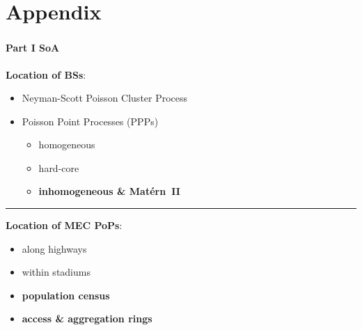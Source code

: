 \documentclass[aspectratio=169]{beamer}
\begin{document}
\section*{Appendix}
\begin{frame}
    \frametitle{\secname}
    \framesubtitle{Part I SoA}
    \textbf{Location of BSs}:
    \begin{itemize}
        \item Neyman-Scott Poisson Cluster Process~\cite{vinay-moller-interference}
        \item Poisson Point Processes (PPPs)~\cite{stochastic-martina}
            \begin{itemize}
                \item homogeneous~\cite{cran-vinay-moller,hetnets-cor}
                \item hard-core~\cite{hard-core-cover} \pause
                \item {\color{red}\textbf{inhomogeneous \& Matérn~II}}
            \end{itemize}
    \end{itemize}
    \pause
    \vfill
    \hrule
    \vfill
    \textbf{Location of MEC PoPs}:
    \begin{itemize}
        \item along highways~\cite{usa-mec}
        \item within stadiums~\cite{tokio-olympics} \pause
        \item {\color{red}\textbf{population census}}
        \item {\color{red}\textbf{access \& aggregation rings}}
    \end{itemize}

\end{frame}
\end{document}

